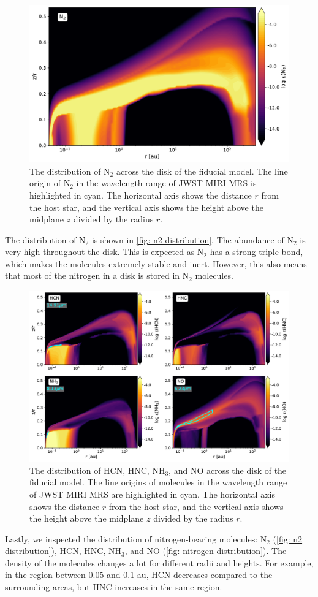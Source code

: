 \documentclass[twoside, single, authoryear, semicolon, 12pt]{lion-msc}
\newcommand{\4}{$_4$}
\newcommand{\3}{$_3$}
\newcommand{\2}{$_2$}
\begin{document}
\begin{figure}[H]
    \centering
    \includegraphics[width=.8\linewidth]{Figures/AbundanceN2.pdf}
    \caption{The distribution of N\2 across the disk of the fiducial model. The line origin of N\2 in the wavelength range of JWST MIRI MRS is highlighted in cyan. The horizontal axis shows the distance $r$ from the host star, and the vertical axis shows the height above the midplane $z$ divided by the radius $r$.}
    \label{fig: n2 distribution}
\end{figure}

The distribution of N\2 is shown in \autoref{fig: n2 distribution}. The abundance of N\2 is very high throughout the disk. This is expected as N\2 has a strong triple bond, which makes the molecules extremely stable and inert. However, this also means that most of the nitrogen in a disk is stored in N\2 molecules. 
\begin{figure}[H]
    \centering
    \includegraphics[width=\linewidth]{Figures/Abundance2.pdf}
    \caption{The distribution of HCN, HNC, NH\3, and NO across the disk of the fiducial model. The line origins of molecules in the wavelength range of JWST MIRI MRS are highlighted in cyan. The horizontal axis shows the distance $r$ from the host star, and the vertical axis shows the height above the midplane $z$ divided by the radius $r$.}
    \label{fig: nitrogen distribution}
\end{figure}
Lastly, we inspected the distribution of nitrogen-bearing molecules: N\2 (\autoref{fig: n2 distribution}), HCN, HNC, NH\3, and NO (\autoref{fig: nitrogen distribution}). The density of the molecules changes a lot for different radii and heights. For example, in the region between 0.05 and 0.1 au, HCN decreases compared to the surrounding areas, but HNC increases in the same region.
\newpage
\end{document}
